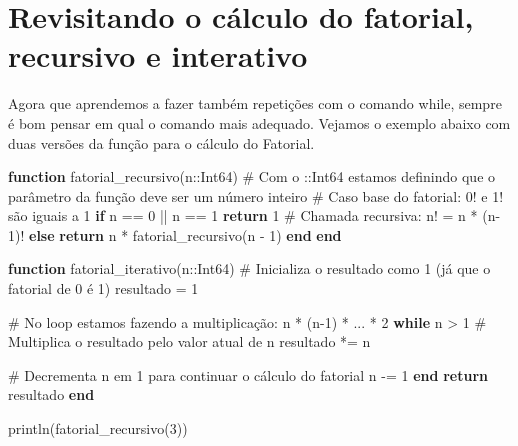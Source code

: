 \documentclass[
  letterpaper,
  DIV=11,
  numbers=noendperiod]{scrreprt}
\newenvironment{Shaded}{\begin{snugshade}}{\end{snugshade}}
\newcommand{\CommentTok}[1]{\textcolor[rgb]{0.37,0.37,0.37}{#1}}
\newcommand{\ControlFlowTok}[1]{\textcolor[rgb]{0.00,0.23,0.31}{\textbf{#1}}}
\newcommand{\DataTypeTok}[1]{\textcolor[rgb]{0.68,0.00,0.00}{#1}}
\newcommand{\FloatTok}[1]{\textcolor[rgb]{0.68,0.00,0.00}{#1}}
\newcommand{\FunctionTok}[1]{\textcolor[rgb]{0.28,0.35,0.67}{#1}}
\newcommand{\KeywordTok}[1]{\textcolor[rgb]{0.00,0.23,0.31}{\textbf{#1}}}
\newcommand{\NormalTok}[1]{\textcolor[rgb]{0.00,0.23,0.31}{#1}}
\newcommand{\OperatorTok}[1]{\textcolor[rgb]{0.37,0.37,0.37}{#1}}
\begin{document}
\section{Revisitando o cálculo do fatorial, recursivo e
interativo}\label{revisitando-o-cuxe1lculo-do-fatorial-recursivo-e-interativo}

Agora que aprendemos a fazer também repetições com o comando while,
sempre é bom pensar em qual o comando mais adequado. Vejamos o exemplo
abaixo com duas versões da função para o cálculo do Fatorial.

\begin{Shaded}
\begin{Highlighting}[]
\KeywordTok{function} \FunctionTok{fatorial\_recursivo}\NormalTok{(n}\OperatorTok{::}\DataTypeTok{Int64}\NormalTok{) }\CommentTok{\# Com o ::Int64 estamos definindo que o parâmetro da função deve ser um número inteiro}
    \CommentTok{\# Caso base do fatorial: 0! e 1! são iguais a 1}
    \ControlFlowTok{if}\NormalTok{ n }\OperatorTok{==} \FloatTok{0} \OperatorTok{||}\NormalTok{ n }\OperatorTok{==} \FloatTok{1}
        \ControlFlowTok{return} \FloatTok{1}
    \CommentTok{\# Chamada recursiva: n! = n * (n{-}1)!}
    \ControlFlowTok{else}
        \ControlFlowTok{return}\NormalTok{ n }\OperatorTok{*} \FunctionTok{fatorial\_recursivo}\NormalTok{(n }\OperatorTok{{-}} \FloatTok{1}\NormalTok{)}
    \ControlFlowTok{end}
\KeywordTok{end}

\KeywordTok{function} \FunctionTok{fatorial\_iterativo}\NormalTok{(n}\OperatorTok{::}\DataTypeTok{Int64}\NormalTok{)}
    \CommentTok{\# Inicializa o resultado como 1 (já que o fatorial de 0 é 1)}
\NormalTok{    resultado }\OperatorTok{=} \FloatTok{1}

    \CommentTok{\# No loop estamos fazendo a multiplicação: n * (n{-}1) * ... * 2}
    \ControlFlowTok{while}\NormalTok{ n }\OperatorTok{\textgreater{}} \FloatTok{1}
        \CommentTok{\# Multiplica o resultado pelo valor atual de n}
\NormalTok{        resultado }\OperatorTok{*=}\NormalTok{ n}

        \CommentTok{\# Decrementa n em 1 para continuar o cálculo do fatorial}
\NormalTok{        n }\OperatorTok{{-}=} \FloatTok{1}
    \ControlFlowTok{end}
    \ControlFlowTok{return}\NormalTok{ resultado}
\KeywordTok{end}

\FunctionTok{println}\NormalTok{(}\FunctionTok{fatorial\_recursivo}\NormalTok{(}\FloatTok{3}\NormalTok{))}
\end{Highlighting}
\end{Shaded}
\end{document}
